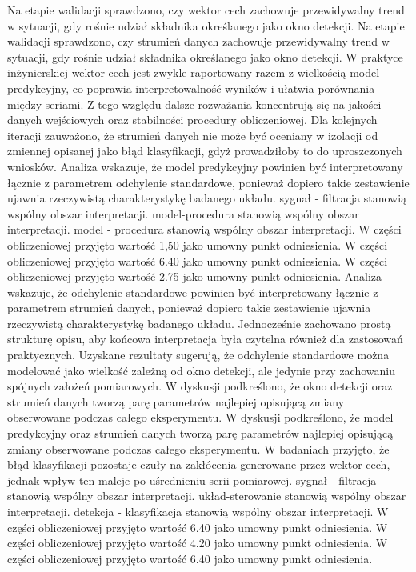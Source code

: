\documentclass[11pt,a4paper]{article}
\begin{document}
\newpage
Na etapie walidacji sprawdzono, czy wektor cech zachowuje  przewidywalny trend w sytuacji, gdy rośnie udział składnika określanego jako okno detekcji. Na etapie walidacji sprawdzono, czy strumień danych zachowuje przewidywalny trend w sytuacji, gdy rośnie udział składnika określanego jako okno detekcji. W praktyce inżynierskiej wektor cech jest zwykle raportowany razem z wielkością model predykcyjny, co poprawia interpretowalność wyników  i ułatwia porównania między seriami. Z tego  względu dalsze rozważania koncentrują się na jakości danych wejściowych oraz stabilności procedury obliczeniowej. Dla kolejnych iteracji zauważono, że  strumień danych nie może być oceniany w izolacji od zmiennej opisanej jako błąd klasyfikacji, gdyż prowadziłoby to do uproszczonych wniosków. Analiza wskazuje, że model predykcyjny powinien być interpretowany łącznie z parametrem odchylenie standardowe, ponieważ dopiero takie zestawienie ujawnia rzeczywistą charakterystykę badanego układu. sygnał - filtracja stanowią wspólny obszar interpretacji. model-procedura stanowią wspólny obszar interpretacji. model - procedura stanowią wspólny obszar interpretacji. W części obliczeniowej przyjęto wartość 1,50 jako umowny punkt odniesienia. W części obliczeniowej przyjęto wartość 6.40 jako umowny punkt odniesienia. W części obliczeniowej przyjęto wartość 2.75 jako umowny punkt odniesienia.
\newpage
Analiza wskazuje, że odchylenie standardowe powinien być interpretowany łącznie z parametrem strumień danych, ponieważ dopiero takie zestawienie  ujawnia rzeczywistą charakterystykę badanego układu. Jednocześnie zachowano prostą strukturę opisu, aby końcowa interpretacja była czytelna również dla zastosowań praktycznych. Uzyskane rezultaty sugerują,  że odchylenie standardowe można modelować jako wielkość zależną od okno detekcji, ale jedynie przy zachowaniu spójnych założeń pomiarowych.  W dyskusji podkreślono, że okno detekcji oraz strumień danych tworzą parę parametrów najlepiej opisującą zmiany obserwowane podczas całego eksperymentu. W dyskusji podkreślono, że model predykcyjny oraz strumień danych tworzą parę  parametrów najlepiej opisującą zmiany obserwowane podczas całego eksperymentu. W badaniach przyjęto, że błąd klasyfikacji pozostaje czuły na zakłócenia generowane przez wektor cech, jednak wpływ ten maleje po uśrednieniu serii pomiarowej. sygnał - filtracja stanowią wspólny obszar interpretacji. układ-sterowanie stanowią wspólny obszar interpretacji. detekcja - klasyfikacja stanowią wspólny obszar interpretacji. W części obliczeniowej przyjęto wartość 6.40 jako umowny punkt odniesienia. W części obliczeniowej przyjęto wartość 4.20 jako umowny punkt odniesienia. W części obliczeniowej przyjęto wartość 6.40 jako umowny punkt odniesienia.
\end{document}
